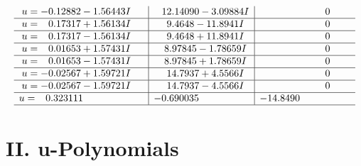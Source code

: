 \documentclass[1p]{elsarticle_modified}
\theoremstyle{definition}
\begin{document}
$$\begin{array}{c|c|c}
\begin{aligned}
u &= -0.12882 - 1.56443 I\end{aligned}
 & \phantom{-}12.14090 - 3.09884 I & \phantom{-0.000000 } 0 \\ \hline\begin{aligned}
u &= \phantom{-}0.17317 + 1.56134 I\end{aligned}
 & \phantom{-}9.4648 - 11.8941 I & \phantom{-0.000000 } 0 \\ \hline\begin{aligned}
u &= \phantom{-}0.17317 - 1.56134 I\end{aligned}
 & \phantom{-}9.4648 + 11.8941 I & \phantom{-0.000000 } 0 \\ \hline\begin{aligned}
u &= \phantom{-}0.01653 + 1.57431 I\end{aligned}
 & \phantom{-}8.97845 - 1.78659 I & \phantom{-0.000000 } 0 \\ \hline\begin{aligned}
u &= \phantom{-}0.01653 - 1.57431 I\end{aligned}
 & \phantom{-}8.97845 + 1.78659 I & \phantom{-0.000000 } 0 \\ \hline\begin{aligned}
u &= -0.02567 + 1.59721 I\end{aligned}
 & \phantom{-}14.7937 + 4.5566 I & \phantom{-0.000000 } 0 \\ \hline\begin{aligned}
u &= -0.02567 - 1.59721 I\end{aligned}
 & \phantom{-}14.7937 - 4.5566 I & \phantom{-0.000000 } 0 \\ \hline\begin{aligned}
u &= \phantom{-}0.323111\phantom{ +0.000000I}\end{aligned}
 & -0.690035\phantom{ +0.000000I} & -14.8490\phantom{ +0.000000I}\\
 \hline 
 \end{array}$$\newpage
\newpage\renewcommand{\arraystretch}{1}
\centering \section*{ II. u-Polynomials}
\end{document}
